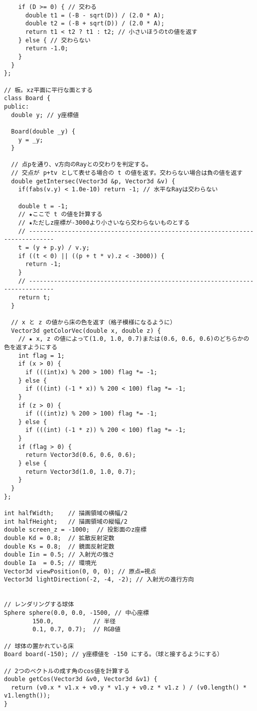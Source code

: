 \documentclass{scrartcl}
\begin{document}
\begin{verbatim}
    if (D >= 0) { // 交わる
      double t1 = (-B - sqrt(D)) / (2.0 * A);
      double t2 = (-B + sqrt(D)) / (2.0 * A);
      return t1 < t2 ? t1 : t2; // 小さいほうのtの値を返す
    } else { // 交わらない
      return -1.0;
    }
  }
};

// 板。xz平面に平行な面とする
class Board {
public:
  double y; // y座標値

  Board(double _y) {
    y = _y;
  }

  // 点pを通り、v方向のRayとの交わりを判定する。
  // 交点が p+tv として表せる場合の t の値を返す。交わらない場合は負の値を返す
  double getIntersec(Vector3d &p, Vector3d &v) {
    if(fabs(v.y) < 1.0e-10) return -1; // 水平なRayは交わらない

    double t = -1;
    // ★ここで t の値を計算する
    // ★ただしz座標が-3000より小さいなら交わらないものとする
    // -----------------------------------------------------------------------------
    t = (y + p.y) / v.y;
    if ((t < 0) || ((p + t * v).z < -3000)) {
      return -1;
    }
    // -----------------------------------------------------------------------------
    return t;
  }

  // x と z の値から床の色を返す（格子模様になるように）
  Vector3d getColorVec(double x, double z) {
    // ★ x, z の値によって(1.0, 1.0, 0.7)または(0.6, 0.6, 0.6)のどちらかの色を返すようにする
    int flag = 1;
    if (x > 0) {
      if (((int)x) % 200 > 100) flag *= -1;
    } else {
      if (((int) (-1 * x)) % 200 < 100) flag *= -1;
    }
    if (z > 0) {
      if (((int)z) % 200 > 100) flag *= -1;
    } else {
      if (((int) (-1 * z)) % 200 < 100) flag *= -1;
    }
    if (flag > 0) {
      return Vector3d(0.6, 0.6, 0.6);
    } else {
      return Vector3d(1.0, 1.0, 0.7);
    }
  }
};

int halfWidth;    // 描画領域の横幅/2
int halfHeight;   // 描画領域の縦幅/2
double screen_z = -1000;  // 投影面のz座標
double Kd = 0.8;  // 拡散反射定数
double Ks = 0.8;  // 鏡面反射定数
double Iin = 0.5; // 入射光の強さ
double Ia  = 0.5; // 環境光
Vector3d viewPosition(0, 0, 0); // 原点=視点
Vector3d lightDirection(-2, -4, -2); // 入射光の進行方向


// レンダリングする球体
Sphere sphere(0.0, 0.0, -1500, // 中心座標
        150.0,           // 半径
        0.1, 0.7, 0.7);  // RGB値

// 球体の置かれている床
Board board(-150); // y座標値を -150 にする。（球と接するようにする）

// 2つのベクトルの成す角のcos値を計算する
double getCos(Vector3d &v0, Vector3d &v1) {
  return (v0.x * v1.x + v0.y * v1.y + v0.z * v1.z ) / (v0.length() * v1.length());
}


\end{verbatim}
\end{document}

